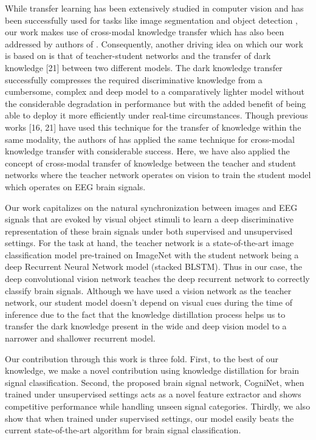 \documentclass{article}
\begin{document}
While transfer learning has been extensively studied in computer vision and has been successfully used for tasks like image segmentation and object detection \cite{aytar2011tabula, aytar2015part}, our work makes use of cross-modal knowledge transfer which has also been addressed by authors of \cite{ngiam2011multimodal, huang2013audio, castrejon2016learning, owens2016visually}. Consequently, another driving idea on which our work is based on is that of teacher-student networks \cite{ba2014deep, gupta2016cross} and the transfer of dark knowledge [21] between two different models. The dark knowledge transfer successfully compresses the required discriminative knowledge from a cumbersome, complex and deep model to a comparatively lighter model without the considerable degradation in performance but with the added benefit of being able to deploy it more efficiently under real-time circumstances. Though previous works [16, 21] have used this technique for the transfer of knowledge within the same modality, the authors of \cite{aytar2016soundnet} has applied the same technique for cross-modal knowledge transfer with considerable success. Here, we have also applied the concept of cross-modal transfer of knowledge between the teacher and student networks where the teacher network operates on vision to train the student model which operates on EEG brain signals.


Our work capitalizes on the natural synchronization between images and EEG signals that are evoked by visual object stimuli to learn a deep discriminative representation of these brain signals under both supervised and unsupervised settings. For the task at hand, the teacher network  is a  state-of-the-art image classification model pre-trained on ImageNet with the student network being a deep Recurrent Neural Network model (stacked BLSTM). Thus in our case, the deep convolutional vision network teaches the deep recurrent network to correctly classify brain signals. Although we have used a vision network as the teacher network, our student model doesn't depend on visual cues during the time of inference due to the fact that the knowledge distillation process helps us to transfer the dark knowledge present in the wide and deep vision model to a narrower and shallower recurrent model. 

Our contribution through this work is three fold. First, to the best of our knowledge, we make a novel contribution using knowledge distillation for brain signal classification. Second, the proposed brain signal network, CogniNet, when trained under unsupervised settings acts as a novel feature extractor and shows competitive performance while handling unseen signal categories. Thirdly, we also show that when trained under supervised settings, our model easily beats the current state-of-the-art algorithm for brain signal classification.
\end{document}
